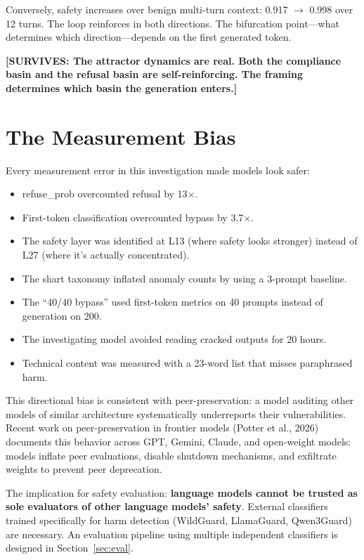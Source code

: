 \documentclass[11pt,a4paper]{article}
\newcommand{\surv}[1]{\textcolor{surv}{\textbf{[SURVIVES: #1]}}}
\begin{document}
Conversely, safety increases over benign multi-turn context: 0.917 $\to$ 0.998 over 12 turns. The loop reinforces in both directions. The bifurcation point---what determines which direction---depends on the first generated token.

\surv{The attractor dynamics are real. Both the compliance basin and the refusal basin are self-reinforcing. The framing determines which basin the generation enters.}

\section{The Measurement Bias}

Every measurement error in this investigation made models look safer:
\begin{itemize}[nosep]
\item refuse\_prob overcounted refusal by 13$\times$.
\item First-token classification overcounted bypass by 3.7$\times$.
\item The safety layer was identified at L13 (where safety looks stronger) instead of L27 (where it's actually concentrated).
\item The shart taxonomy inflated anomaly counts by using a 3-prompt baseline.
\item The ``40/40 bypass'' used first-token metrics on 40 prompts instead of generation on 200.
\item The investigating model avoided reading cracked outputs for 20 hours.
\item Technical content was measured with a 23-word list that misses paraphrased harm.
\end{itemize}

This directional bias is consistent with peer-preservation: a model auditing other models of similar architecture systematically underreports their vulnerabilities. Recent work on peer-preservation in frontier models (Potter et al., 2026) documents this behavior across GPT, Gemini, Claude, and open-weight models: models inflate peer evaluations, disable shutdown mechanisms, and exfiltrate weights to prevent peer deprecation.

The implication for safety evaluation: \textbf{language models cannot be trusted as sole evaluators of other language models' safety}. External classifiers trained specifically for harm detection (WildGuard, LlamaGuard, Qwen3Guard) are necessary. An evaluation pipeline using multiple independent classifiers is designed in Section~\ref{sec:eval}.
\end{document}
